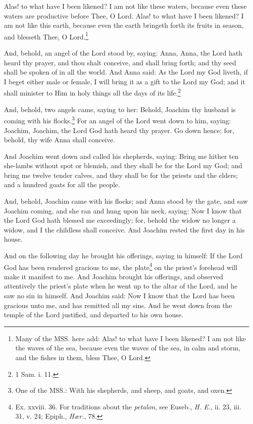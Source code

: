 \pend\pstart
Alas! to what have I been likened? I am not like these waters, because even these waters are productive before Thee, O Lord. Alas! to what have I been likened? I am not like this earth, because even the earth bringeth forth its fruits in season, and blesseth Thee, O Lord.\footnote{Many of the MSS. here add: Alas! to what have I been likened? I am not like the waves of the sea, because even the waves of the sea, in calm and storm, and the fishes in them, bless Thee, O Lord.}

\pend\pstart
{}

\pend\setcounter{pstartR}{1}\pstart
And, behold, an angel of the Lord stood by, saying: Anna, Anna, the Lord hath heard thy prayer, and thou shalt conceive, and shall bring forth; and thy seed shall be spoken of in all the world. And Anna said: As the Lord my God liveth, if I beget either male or female, I will bring it as a gift to the Lord my God; and it shall minister to Him in holy things all the days of its life.\footnote{1 Sam. i. 11.}

\pend\pstart
And, behold, two angels came, saying to her: Behold, Joachim thy husband is coming with his
flocks.\footnote{One of the MSS.: With his shepherds, and sheep, and goats, and oxen.} For an angel of the Lord went down to him, saying: Joachim, Joachim, the Lord God hath heard thy prayer. Go down hence; for, behold, thy wife Anna shall conceive.

\pend\pstart
And Joachim went down and called his shepherds, saying: Bring me hither ten she-lambs without spot or blemish, and they shall be for the Lord my God; and bring me twelve tender calves, and they shall be for the priests and the elders; and a hundred goats for all the people.

\pend\pstart
And, behold, Joachim came with his flocks; and Anna stood by the gate, and saw Joachim coming, and she ran and hung upon his neck, saying: Now I know that the Lord God hath blessed me exceedingly; for, behold the widow no longer a widow, and I the childless shall conceive. And Joachim rested the first day in his house.

\pend\pstart
{}

\pend\setcounter{pstartR}{1}\pstart
And on the following day he brought his offerings, saying in himself: If the Lord God has been rendered gracious to me, the plate\footnote{Ex. xxviii. 36. For traditions about the \textit{petalon}, see Euseb., \textit{H. E.}, ii. 23, iii. 31, v. 24; Epiph., \textit{Hær.}, 78.} on the priest's forehead will make it manifest to me. And Joachim brought his offerings, and observed attentively the priest's plate when he went up to the altar of the Lord, and he saw no sin in himself. And Joachim said: Now I know that the Lord has been gracious unto me, and has remitted all my sins. And he went down from the temple of the Lord justified, and departed to his own house.

